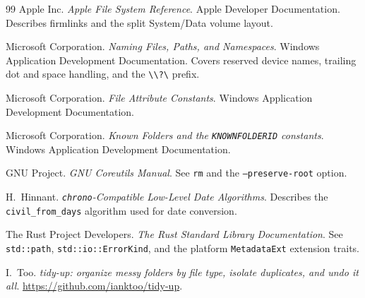 \documentclass[11pt,a4paper]{article}
\newcommand{\code}[1]{\texttt{\small #1}}
\begin{document}
\begin{thebibliography}{99}
Apple Inc.
\newblock \emph{Apple File System Reference}.
\newblock Apple Developer Documentation. Describes firmlinks and the split
  System/Data volume layout.

Microsoft Corporation.
\newblock \emph{Naming Files, Paths, and Namespaces}.
\newblock Windows Application Development Documentation. Covers reserved device names,
  trailing dot and space handling, and the \code{\textbackslash\textbackslash?\textbackslash} prefix.

Microsoft Corporation.
\newblock \emph{File Attribute Constants}.
\newblock Windows Application Development Documentation.

Microsoft Corporation.
\newblock \emph{Known Folders and the \code{KNOWNFOLDERID} constants}.
\newblock Windows Application Development Documentation.

GNU Project.
\newblock \emph{GNU Coreutils Manual}.
\newblock See \code{rm} and the \code{--preserve-root} option.

H.~Hinnant.
\newblock \emph{\code{chrono}-Compatible Low-Level Date Algorithms}.
\newblock Describes the \code{civil\_from\_days} algorithm used for date conversion.

The Rust Project Developers.
\newblock \emph{The Rust Standard Library Documentation}.
\newblock See \code{std::path}, \code{std::io::ErrorKind}, and the platform
  \code{MetadataExt} extension traits.

I.~Too.
\newblock \emph{tidy-up: organize messy folders by file type, isolate duplicates, and
  undo it all}.
\newblock \url{https://github.com/ianktoo/tidy-up}.

\end{thebibliography}
\end{document}
